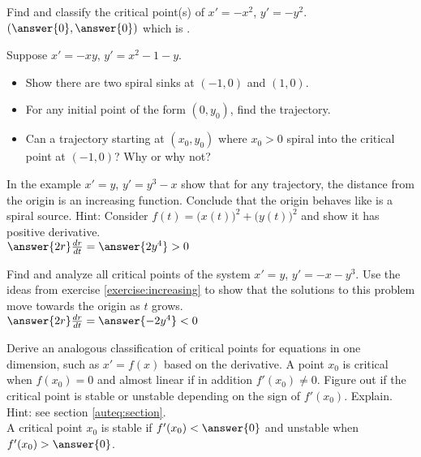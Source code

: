 \documentclass{ximera}
\begin{document}
\begin{exercise}
    Find and classify the critical point(s) of $x' = -x^2$, $y' = -y^2$.\\
    $\left(\answer{0}, \answer{0}\right)$ which is .
\end{exercise}


\begin{exercise}
    Suppose $x'=-xy$, $y'=x^2-1-y$.
    \begin{itemize}
        \item Show there are two spiral sinks at $(-1,0)$ and $(1,0)$.
        \item For any initial point of the form $(0,y_0)$, find the trajectory.
        \item Can a trajectory starting at $(x_0,y_0)$ where $x_0 > 0$ spiral into the critical point at $(-1,0)$?  Why or why not?
    \end{itemize}
\end{exercise}



\begin{exercise} \label{exercise:increasing}
    In the example $x'=y$, $y'=y^3-x$ show that for any trajectory, the distance from the origin is an increasing function. Conclude that the origin behaves like is a spiral source. Hint: Consider 
    $f(t) = {\bigl(x(t)\bigr)}^2 + {\bigl(y(t)\bigr)}^2$ and show it has positive derivative.\\
    $\answer{2r}\frac{dr}{dt} = \answer{2y^4} > 0$
\end{exercise}

\begin{exercise}
    Find and analyze all critical points of the system $x' = y$, $y' = -x - y^3$. Use the ideas from exercise \ref{exercise:increasing} to show that the solutions to this problem move towards the origin as $t$ grows.\\
    $\answer{2r}\frac{dr}{dt} = \answer{-2y^4} < 0$
\end{exercise}

\begin{exercise}%
    Derive an analogous classification of critical points for equations in one dimension, such as $x'= f(x)$ based on the derivative.  A point $x_0$ is critical when $f(x_0) = 0$ and almost linear if in addition $f'(x_0) \not= 0$.  Figure out if the critical point is stable or unstable depending on the sign of $f'(x_0)$.  Explain.  Hint: see section \ref{auteq:section}.\\
    A critical point $x_0$ is stable if $f'(x_0) < \answer{0}$ and unstable when $f'(x_0) > \answer{0}$.
\end{exercise}

%
\end{document}
